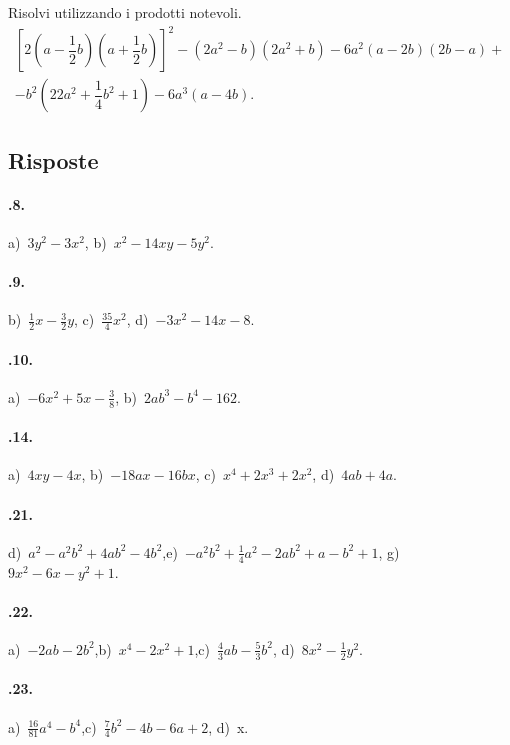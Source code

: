 \begin{esercizio}[\Ast]
Risolvi utilizzando i prodotti notevoli.
\begin{multline*}
\left[2\left(a-\dfrac{1}{2}b\right)\left(a+\dfrac{1}{2}b\right)\right]^{2}-\left(2a^{2}-b\right)\left(2a^{2}+b\right)-6a^{2}(a-2b)(2b-a)+\\
-b^{2}\left(22a^{2}+\dfrac{1}{4}b^{2}+1\right)-6a^{3}(a-4b).
\end{multline*}
\end{esercizio}

\subsection{Risposte}
\paragraph{\thechapter.8.} a)~$3y^{2}-3x^{2}$, \quad b)~$x^{2}-14xy-5y^{2}$.
\paragraph{\thechapter.9.} b)~$\frac{1}{2}x-\frac{3}{2}y$, \quad c)~$\frac{35}{4}x^{2}$, \quad d)~$-3x^{2}-14x-8$.
\paragraph{\thechapter.10.} a)~$-6x^{2}+5x-\frac{3}{8}$, \quad b)~$2{ab}^{3}-b^{4}-162$.
\paragraph{\thechapter.14.} a)~$4{xy}-4x$, \quad b)~$-18ax-16bx$, \quad c)~$x^{4}+2x^{3}+2x^{2}$, \quad d)~$4ab+4a$.
\paragraph{\thechapter.21.} d)~$a^{2}-a^{2}b^{2}+4{ab}^{2}-4b^{2}$,\quad e)~$-a^{2}b^{2}+\frac{1}{4}a^{2}-2{ab}^{2}+a-b^{2}+1$,\quad%
g)~$9x^{2}-6x-y^{2}+1$.
\paragraph{\thechapter.22.} a)~$-2{ab}-2b^{2}$,\quad b)~$x^{4}-2x^{2}+1$,\quad c)~$\frac{4}{3}{ab}-\frac{5}{3}b^{2}$, \quad d)~$8x^2-\frac{1}{2}y^2$.
\paragraph{\thechapter.23.} a)~$\frac{16}{81}a^{4}-b^{4}$,\quad c)~$\frac{7}{4}b^{2}-4b-6a+2$, \quad d)~x.
